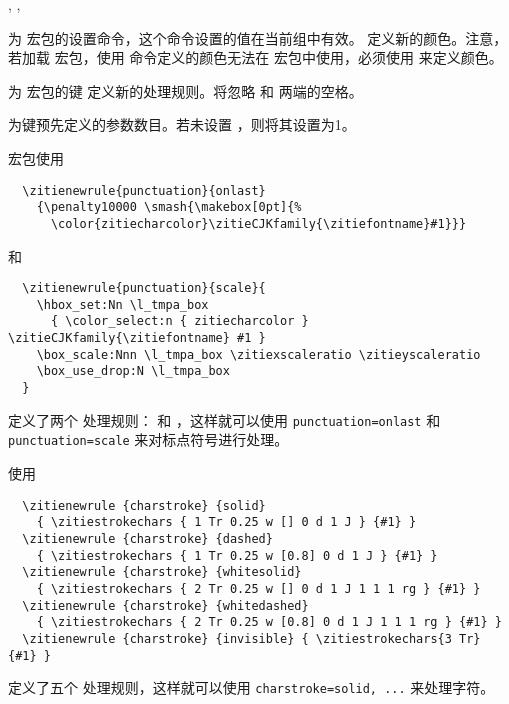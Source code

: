 \documentclass{ctxdoc}
\begin{document}
\begin{function}{
  \zitiesetup,
  \zitiecolorlet,
}
  \begin{syntax}
     
       
  \end{syntax}
   为  宏包的设置命令，这个命令设置的值在当前组中有效。 定义新的颜色。注意，若加载  宏包，使用  命令定义的颜色无法在  宏包中使用，必须使用  来定义颜色。
\end{function}

\begin{function}{\zitienewrule}
  \begin{syntax}
        
  \end{syntax}
  为  宏包的键  定义新的处理规则。将忽略  和  两端的空格。

   为键预先定义的参数数目。若未设置 ，则将其设置为1。
\end{function}

 宏包使用
\begin{verbatim}
  \zitienewrule{punctuation}{onlast}
    {\penalty10000 \smash{\makebox[0pt]{%
      \color{zitiecharcolor}\zitieCJKfamily{\zitiefontname}#1}}}
\end{verbatim}
和
\begin{verbatim}
  \zitienewrule{punctuation}{scale}{
    \hbox_set:Nn \l_tmpa_box 
      { \color_select:n { zitiecharcolor } \zitieCJKfamily{\zitiefontname} #1 }
    \box_scale:Nnn \l_tmpa_box \zitiexscaleratio \zitieyscaleratio 
    \box_use_drop:N \l_tmpa_box 
  }
\end{verbatim}
定义了两个  处理规则： 和 ，这样就可以使用 \verb|punctuation=onlast| 和 \verb|punctuation=scale| 来对标点符号进行处理。

使用
\begin{verbatim}
  \zitienewrule {charstroke} {solid}
    { \zitiestrokechars { 1 Tr 0.25 w [] 0 d 1 J } {#1} }
  \zitienewrule {charstroke} {dashed}
    { \zitiestrokechars { 1 Tr 0.25 w [0.8] 0 d 1 J } {#1} }
  \zitienewrule {charstroke} {whitesolid}
    { \zitiestrokechars { 2 Tr 0.25 w [] 0 d 1 J 1 1 1 rg } {#1} }
  \zitienewrule {charstroke} {whitedashed}
    { \zitiestrokechars { 2 Tr 0.25 w [0.8] 0 d 1 J 1 1 1 rg } {#1} }
  \zitienewrule {charstroke} {invisible} { \zitiestrokechars{3 Tr} {#1} }
\end{verbatim}
定义了五个  处理规则，这样就可以使用 \verb|charstroke=solid, ...| 来处理字符。
\end{document}
